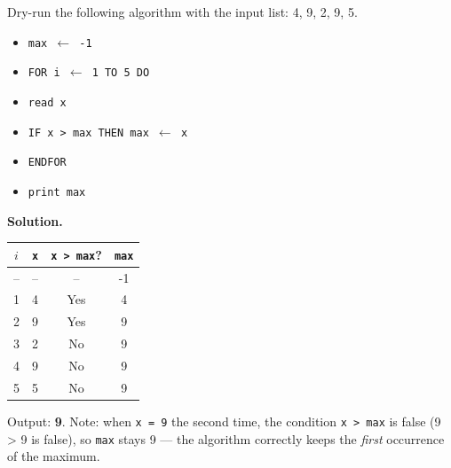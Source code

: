\documentclass[11pt]{article}
\begin{document}
\begin{exoresolu}
Dry-run the following algorithm with the input list: 4, 9, 2, 9, 5.
\begin{itemize}
\item[] \texttt{max $\leftarrow$ -1}
\item[] \texttt{FOR i $\leftarrow$ 1 TO 5 DO}
\item[] \texttt{\quad read x}
\item[] \texttt{\quad IF x > max THEN max $\leftarrow$ x}
\item[] \texttt{ENDFOR}
\item[] \texttt{print max}
\end{itemize}
\tcblower
\textbf{Solution.}

\begin{center}
\begin{tabular}{|c|c|c|c|}
\hline
\rowcolor{popblueL} $i$ & \texttt{x} & \texttt{x > max}? & \texttt{max} \\
\hline
-- & -- & -- & -1 \\
\hline
1 & 4 & Yes & 4 \\
\hline
2 & 9 & Yes & 9 \\
\hline
3 & 2 & No & 9 \\
\hline
4 & 9 & No & 9 \\
\hline
5 & 5 & No & 9 \\
\hline
\end{tabular}
\end{center}
Output: \textbf{9}. Note: when \texttt{x = 9} the second time, the condition \texttt{x > max} is false (9 > 9 is false), so \texttt{max} stays 9 — the algorithm correctly keeps the \emph{first} occurrence of the maximum.
\end{exoresolu}
\end{document}
